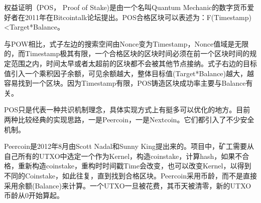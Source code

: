 \documentclass[a4paper,12pt]{article}
\begin{document}



权益证明（POS， Proof of Stake)是由一个名叫Quantum Mechanic的数字货币爱好者在2011年在Bitcointalk论坛提出。POS合格区块可以表述为：F(Timestamp)<Target*Balance。

与POW相比，式子左边的搜索空间由Nonce变为Timestamp，Nonce值域是无限的，而Timestamp极其有限，一个合格区块的区块时间必须在前一个区块时间的规定范围之内，时间太早或者太超前的区块都不会被其他节点接纳。式子右边的目标值引入一个乘积因子余额，可见余额越大，整体目标值(Target*Balance)越大，越容易找到一个区块。因为Timestamp有限，POS铸造区块成功率主要与Balance有关。

POS只是代表一种共识机制理念，具体实现方式上有挺多可以优化的地方。目前两种比较经典的实现思路，一是Peercoin，一是Nextcoin。它们都引入了不少安全机制。




Peercoin是2012年8月由Scott Nadal和Sunny King提出来的。项目中，矿工需要从自己所有的UTXO中选定一个作为Kernel，构造coinstake，计算hash，如果不合格，重新构造coinstake，重构时时间戳Time会改变，也可以改变Kernel，以得到不同的Coinstake，如此往复，直到找到合格区块。Peercoin采用币龄，而不是直接采用余额(Balance)来计算。一个UTXO一旦被花费，其币天被清零，新的UTXO币龄从0开始算起。

\end{document}

